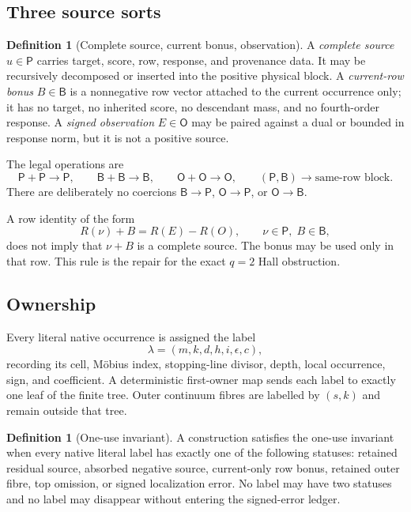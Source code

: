 \documentclass[11pt]{article}
\theoremstyle{definition}
\newtheorem{definition}[theorem]{Definition}
\theoremstyle{remark}
\newcommand{\1}{\mathbf 1}
\newcommand{\Src}{\mathsf P}
\newcommand{\Bonus}{\mathsf B}
\newcommand{\Obs}{\mathsf O}
\begin{document}
\subsection{Three source sorts}

\begin{definition}[Complete source, current bonus, observation]\label{def:sorts}
A \emph{complete source} \(u\in\Src\) carries target, score, row, response, and provenance data.  It may be recursively decomposed or inserted into the positive physical block.  A \emph{current-row bonus} \(B\in\Bonus\) is a nonnegative row vector attached to the current occurrence only; it has no target, no inherited score, no descendant mass, and no fourth-order response.  A \emph{signed observation} \(E\in\Obs\) may be paired against a dual or bounded in response norm, but it is not a positive source.
\end{definition}

The legal operations are
\[
\Src+\Src\to\Src,
\qquad
\Bonus+\Bonus\to\Bonus,
\qquad
\Obs+\Obs\to\Obs,
\qquad
(\Src,\Bonus)\to\text{same-row block}.
\]
There are deliberately no coercions \(\Bonus\to\Src\), \(\Obs\to\Src\), or \(\Obs\to\Bonus\).

\begin{interfacebox}
A row identity of the form
\[
R(\nu)+B=R(E)-R(O),\qquad \nu\in\Src,\;B\in\Bonus,
\]
does not imply that \(\nu+B\) is a complete source.  The bonus may be used only in that row.  This rule is the repair for the exact \(q=2\) Hall obstruction.
\end{interfacebox}

\subsection{Ownership}

Every literal native occurrence is assigned the label
\begin{equation}\label{eq:label}
\lambda=(m,k,d,h,i,\epsilon,c),
\end{equation}
recording its cell, M\"obius index, stopping-line divisor, depth, local occurrence, sign, and coefficient.  A deterministic first-owner map sends each label to exactly one leaf of the finite tree.  Outer continuum fibres are labelled by \((s,k)\) and remain outside that tree.

\begin{definition}[One-use invariant]\label{def:one-use}
A construction satisfies the one-use invariant when every native literal label has exactly one of the following statuses: retained residual source, absorbed negative source, current-only row bonus, retained outer fibre, top omission, or signed localization error.  No label may have two statuses and no label may disappear without entering the signed-error ledger.
\end{definition}
\end{document}
